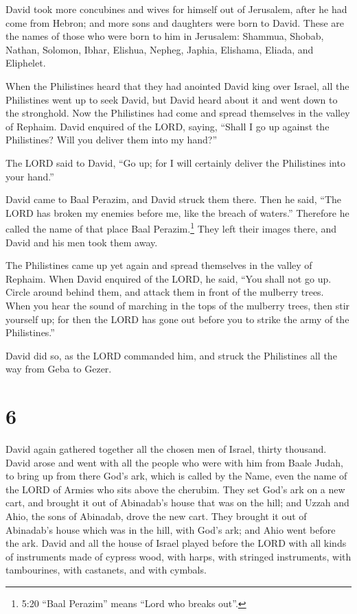  David took more concubines and wives for himself out of
Jerusalem, after he had come from Hebron; and more sons and daughters
were born to David.  These are the names of those who were
born to him in Jerusalem: Shammua, Shobab, Nathan, Solomon,
 Ibhar, Elishua, Nepheg, Japhia,  Elishama,
Eliada, and Eliphelet.

 When the Philistines heard that they had anointed David
king over Israel, all the Philistines went up to seek David, but David
heard about it and went down to the stronghold.  Now the
Philistines had come and spread themselves in the valley of Rephaim.
 David enquired of the LORD, saying, ``Shall I go up
against the Philistines? Will you deliver them into my hand?''

The LORD said to David, ``Go up; for I will certainly deliver the
Philistines into your hand.''

 David came to Baal Perazim, and David struck them there.
Then he said, ``The LORD has broken my enemies before me, like the
breach of waters.'' Therefore he called the name of that place Baal
Perazim.\footnote{5:20 ``Baal Perazim'' means ``Lord who breaks out''.}
 They left their images there, and David and his men took
them away.

 The Philistines came up yet again and spread themselves in
the valley of Rephaim.  When David enquired of the LORD, he
said, ``You shall not go up. Circle around behind them, and attack them
in front of the mulberry trees.  When you hear the sound of
marching in the tops of the mulberry trees, then stir yourself up; for
then the LORD has gone out before you to strike the army of the
Philistines.''

 David did so, as the LORD commanded him, and struck the
Philistines all the way from Geba to Gezer.

\hypertarget{section-5}{%
\section{6}\label{section-5}}

 David again gathered together all the chosen men of Israel,
thirty thousand.  David arose and went with all the people
who were with him from Baale Judah, to bring up from there God's ark,
which is called by the Name, even the name of the LORD of Armies who
sits above the cherubim.  They set God's ark on a new cart,
and brought it out of Abinadab's house that was on the hill; and Uzzah
and Ahio, the sons of Abinadab, drove the new cart.  They
brought it out of Abinadab's house which was in the hill, with God's
ark; and Ahio went before the ark.  David and all the house
of Israel played before the LORD with all kinds of instruments made of
cypress wood, with harps, with stringed instruments, with tambourines,
with castanets, and with cymbals.


